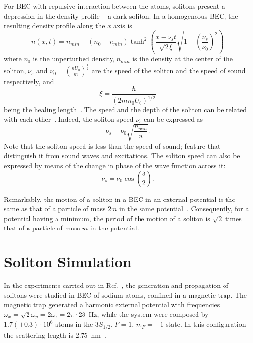 For BEC with repulsive interaction between the atoms, solitons present a depression in the density profile -- a dark soliton. In a homogeneous BEC, the resulting density profile along the $x$ axis is
\begin{equation}
n(x,t) = n_{min} + \left(n_0 - n_{min}\right)\tanh^2 \left( \frac{x - \nu_s t}{\sqrt{2} \xi} \sqrt{1 - \left( \frac{\nu_s}{\nu_0} \right)^2 } \right)
\end{equation}
where $n_0$ is the unperturbed density, $n_{min}$ is the density at the center of the soliton, $\nu_s$ and  $\nu_0 = (\frac{nU_0}{m})^{\frac{1}{2}}$ are the speed of the soliton and the speed of sound respectively, and 
\begin{equation}
\xi = \frac{\hbar}{\left( 2mn_0 U_0 \right)^{1/2}}
\end{equation}
being the healing length~\citep{pethick2002bose}. The speed and the depth of the soliton can be related with each other~\citep{RC97,JKP98}. Indeed, the soliton speed $\nu_s$ can be expressed as
\begin{equation} \label{eq:soliton-speed-density}
\nu_s = \nu_0 \sqrt{ \frac{n_{min}}{n} }.
\end{equation}
Note that the soliton speed is less than the speed of sound; feature that distinguish it from sound waves and excitations. The soliton speed can also be expressed by means of the change in phase of the wave function across it:
\begin{equation}
\nu_s = \nu_0 \cos \left( \frac{\delta}{2} \right).
\end{equation}

Remarkably, the motion of a soliton in a BEC in an external potential is the same as that of a particle of mass $2m$ in the same potential~\citep{pethick2002bose}. Consequently, for a potential having a minimum, the period of the motion of a soliton is $\sqrt{2}$ times that of a particle of mass $m$ in the potential.

\section{Soliton Simulation}
In the experiments carried out in Ref.~\citep{DSF00}, the generation and propagation of solitons were studied in BEC of sodium atoms, confined in a magnetic trap. The magnetic trap generated a harmonic external potential with frequencies $\omega_x = \sqrt{2}\omega_y = 2 \omega_z = 2 \pi \cdot 28$~Hz, while the system were composed by  $1.7 (\pm 0.3) \cdot 10^6$ atoms in the $3S_{1/2}$, $F=1$, $m_F=-1$ state. In this configuration the scattering length is $2.75$~nm~\citep{DSF00}. 

